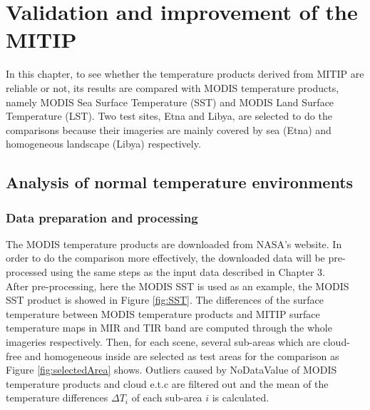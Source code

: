 \chapter{Validation and improvement of the MITIP}

\label{Chapter4}

In this chapter, to see whether the temperature products derived from MITIP are reliable or not, its results are compared with MODIS temperature products, namely MODIS Sea Surface Temperature (SST) and MODIS Land Surface Temperature (LST). Two test sites, Etna and Libya, are selected to do the comparisons because their imageries are mainly covered by sea (Etna) and homogeneous landscape (Libya) respectively.\\


\section{Analysis of normal temperature environments}


\subsection{Data preparation and processing}
The MODIS temperature products are downloaded from NASA's website. In order to do the comparison more effectively, the downloaded data will be pre-processed using the same steps as the input data described in Chapter 3.\\

\noindent After pre-processing, here the MODIS SST is used as an example, the MODIS SST product is showed in Figure \ref{fig:SST}. The differences of the surface temperature between MODIS temperature products and MITIP surface temperature maps in MIR and TIR band are computed through the whole imageries respectively. Then, for each scene, several sub-areas which are cloud-free and homogeneous inside are selected as test areas for the comparison as Figure \ref{fig:selectedArea} shows. Outliers caused by NoDataValue of MODIS temperature products and cloud e.t.c are filtered out and the mean of the temperature differences $\Delta T_i$ of each sub-area $i$ is calculated.\\

